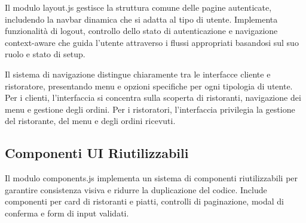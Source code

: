 \documentclass[12pt,a4paper]{article}
\begin{document}
Il modulo layout.js gestisce la struttura comune delle pagine autenticate, includendo la navbar dinamica che si adatta al tipo di utente. Implementa funzionalità di logout, controllo dello stato di autenticazione e navigazione context-aware che guida l'utente attraverso i flussi appropriati basandosi sul suo ruolo e stato di setup.

Il sistema di navigazione distingue chiaramente tra le interfacce cliente e ristoratore, presentando menu e opzioni specifiche per ogni tipologia di utente. Per i clienti, l'interfaccia si concentra sulla scoperta di ristoranti, navigazione dei menu e gestione degli ordini. Per i ristoratori, l'interfaccia privilegia la gestione del ristorante, del menu e degli ordini ricevuti.

\subsection{Componenti UI Riutilizzabili}

Il modulo components.js implementa un sistema di componenti riutilizzabili per garantire consistenza visiva e ridurre la duplicazione del codice. Include componenti per card di ristoranti e piatti, controlli di paginazione, modal di conferma e form di input validati.
\end{document}
